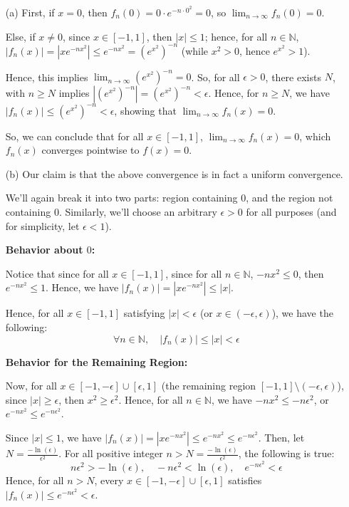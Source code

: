 \documentclass{article}
\begin{document}
\begin{itemize}
    \item[(a)] First, if $x=0$, then $f_n(0) = 0\cdot e^{-n\cdot 0^2}=0$, so $\lim_{n\rightarrow\infty}f_n(0)=0$.
    
    \hfill
    
    Else, if $x\neq 0$, since $x\in[-1,1]$, then $|x|\leq 1$; hence, for all $n\in\mathbb{N}$, $|f_n(x)| = |xe^{-nx^2}| \leq e^{-nx^2} = (e^{x^2})^{-n}$ (while $x^2>0$, hence $e^{x^2}>1$).

    Hence, this implies $\lim_{n\rightarrow\infty}(e^{x^2})^{-n}=0$. So, for all $\epsilon>0$, there exists $N$, with $n\geq N$ implies $|(e^{x^2})^{-n}| = (e^{x^2})^{-n}<\epsilon$. Hence, for $n\geq N$,
    we have $|f_n(x)| \leq (e^{x^2})^{-n}<\epsilon$, showing that $\lim_{n\rightarrow\infty}f_n(x)=0$.

    So, we can conclude that for all $x\in[-1,1]$, $\lim_{n\rightarrow\infty}f_n(x)=0$, which $f_n(x)$ converges pointwise to $f(x)=0$.
    
    \hfill

    \item[(b)] Our claim is that the above convergence is in fact a uniform convergence.
    
    We'll again break it into two parts: region containing $0$, and the region not containing $0$.
    Similarly, we'll choose an arbitrary $\epsilon>0$ for all purposes (and for simplicity, let $\epsilon<1$).

    \textbf{Behavior about $0$:}
    
    Notice that since for all $x\in [-1,1]$, since for all $n\in\mathbb{N}$, $-nx^2\leq 0$, then $e^{-nx^2}\leq 1$. Hence, we have $|f_n(x)|=|xe^{-nx^2}|\leq |x|$.

    Hence, for all $x\in[-1,1]$ satisfying $|x|<\epsilon$ (or $x\in (-\epsilon,\epsilon)$), we have the following:
    $$\forall n\in\mathbb{N},\quad |f_n(x)|\leq |x|<\epsilon$$

    \textbf{Behavior for the Remaining Region:}

    Now, for all $x\in [-1,-\epsilon]\cup [\epsilon,1]$ (the remaining region $[-1,1]\setminus (-\epsilon,\epsilon)$), since $|x|\geq \epsilon$, then $x^2\geq \epsilon^2$.
    Hence, for all $n\in\mathbb{N}$, we have $-nx^2\leq -n\epsilon^2$, or $e^{-nx^2}\leq e^{-n\epsilon^2}$.

    Since $|x|\leq 1$, we have $|f_n(x)| = |xe^{-nx^2}| \leq e^{-nx^2}\leq e^{-n\epsilon^2}$. Then, let $N=\frac{-\ln(\epsilon)}{\epsilon^2}$. For all positive integer $n>N=\frac{-\ln(\epsilon)}{\epsilon^2}$, the following is true:
    $$n\epsilon^2 > -\ln(\epsilon),\quad -n\epsilon^2<\ln(\epsilon),\quad e^{-n\epsilon^2}<\epsilon$$
    Hence, for all $n>N$, every $x\in [-1,-\epsilon]\cup [\epsilon,1]$ satisfies $|f_n(x)| \leq e^{-n\epsilon^2}<\epsilon$.


\end{itemize}
\end{document}
